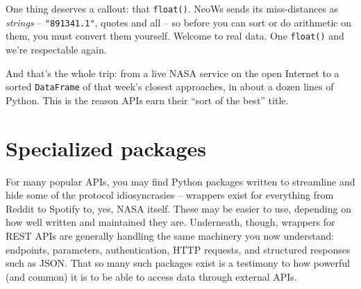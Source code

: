 
One thing deserves a callout: that \texttt{float()}. NeoWs sends its
miss-distances as \textit{strings} -- \texttt{"891341.1"}, quotes and all --
so before you can sort or do arithmetic on them, you must convert them
yourself. Welcome to real data. One \texttt{float()} and we're respectable
again.

And that's the whole trip: from a live NASA service on the open Internet to a
sorted \texttt{DataFrame} of that week's closest approaches, in about a dozen
lines of Python. This is the reason APIs earn their ``sort of the best''
title.

\section{Specialized packages}

For many popular APIs, you may find Python packages written to streamline and
hide some of the protocol idiosyncrasies -- wrappers exist for everything from
Reddit to Spotify to, yes, NASA itself. These may be easier to use, depending
on how well written and maintained they are. Underneath, though, wrappers for
REST APIs are generally handling the same machinery you now understand:
endpoints, parameters, authentication, HTTP requests, and structured responses
such as JSON. That so many such packages exist is a testimony to how powerful
(and common) it is to be able to access data through external APIs.